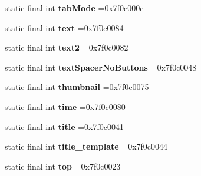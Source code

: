 \begin{DoxyCompactItemize}
\item 
\hypertarget{classcheck_1_1test_1_1_r_1_1id_a2e5b94af0bcde09931e29bca1fa6e8bb}{}static final int {\bfseries tab\+Mode} =0x7f0c000c\label{classcheck_1_1test_1_1_r_1_1id_a2e5b94af0bcde09931e29bca1fa6e8bb}

\item 
\hypertarget{classcheck_1_1test_1_1_r_1_1id_ade0af31f3a713b41343b1491e95f98b5}{}static final int {\bfseries text} =0x7f0c0084\label{classcheck_1_1test_1_1_r_1_1id_ade0af31f3a713b41343b1491e95f98b5}

\item 
\hypertarget{classcheck_1_1test_1_1_r_1_1id_a6594515b6f17b2d51bab81ab7ca565cf}{}static final int {\bfseries text2} =0x7f0c0082\label{classcheck_1_1test_1_1_r_1_1id_a6594515b6f17b2d51bab81ab7ca565cf}

\item 
\hypertarget{classcheck_1_1test_1_1_r_1_1id_ab9c9d3e34a93e61aafa1dd0b78348a9f}{}static final int {\bfseries text\+Spacer\+No\+Buttons} =0x7f0c0048\label{classcheck_1_1test_1_1_r_1_1id_ab9c9d3e34a93e61aafa1dd0b78348a9f}

\item 
\hypertarget{classcheck_1_1test_1_1_r_1_1id_a890feb897925907af46c11ee11021b5c}{}static final int {\bfseries thumbnail} =0x7f0c0075\label{classcheck_1_1test_1_1_r_1_1id_a890feb897925907af46c11ee11021b5c}

\item 
\hypertarget{classcheck_1_1test_1_1_r_1_1id_a1f760c0ac24bade7599bfb4e808cce10}{}static final int {\bfseries time} =0x7f0c0080\label{classcheck_1_1test_1_1_r_1_1id_a1f760c0ac24bade7599bfb4e808cce10}

\item 
\hypertarget{classcheck_1_1test_1_1_r_1_1id_a22809e30ef7672e73075e3d2c4424fd3}{}static final int {\bfseries title} =0x7f0c0041\label{classcheck_1_1test_1_1_r_1_1id_a22809e30ef7672e73075e3d2c4424fd3}

\item 
\hypertarget{classcheck_1_1test_1_1_r_1_1id_abb9713147f40052ece7a17bffee8739d}{}static final int {\bfseries title\+\_\+template} =0x7f0c0044\label{classcheck_1_1test_1_1_r_1_1id_abb9713147f40052ece7a17bffee8739d}

\item 
\hypertarget{classcheck_1_1test_1_1_r_1_1id_af2d5df0c49bdc4a19f7c924595f83c11}{}static final int {\bfseries top} =0x7f0c0023\label{classcheck_1_1test_1_1_r_1_1id_af2d5df0c49bdc4a19f7c924595f83c11}


\end{DoxyCompactItemize}
